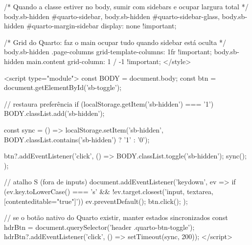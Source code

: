 \documentclass[
  portuguese,
  letterpaper,
  DIV=11,
  numbers=noendperiod]{scrreprt}
\begin{document}
  /* Quando a classe estiver no body, sumir com sidebars e ocupar largura total */
  body.sb-hidden #quarto-sidebar,
  body.sb-hidden #quarto-sidebar-glass,
  body.sb-hidden #quarto-margin-sidebar { display: none !important; }

  /* Grid do Quarto: faz o main ocupar tudo quando sidebar está oculta */
  body.sb-hidden .page-columns { grid-template-columns: 1fr !important; }
  body.sb-hidden main.content { grid-column: 1 / -1 !important; }
</style>

<script type="module">
  const BODY = document.body;
  const btn  = document.getElementById('sb-toggle');

  // restaura preferência
  if (localStorage.getItem('sb-hidden') === '1') BODY.classList.add('sb-hidden');

  const sync = () => localStorage.setItem('sb-hidden', BODY.classList.contains('sb-hidden') ? '1' : '0');

  btn?.addEventListener('click', () => { BODY.classList.toggle('sb-hidden'); sync(); });

  // atalho S (fora de inputs)
  document.addEventListener('keydown', ev => {
    if (ev.key.toLowerCase() === 's' && !ev.target.closest('input, textarea, [contenteditable="true"]')) {
      ev.preventDefault(); btn.click();
    }
  });

  // se o botão nativo do Quarto existir, manter estados sincronizados
  const hdrBtn = document.querySelector('header .quarto-btn-toggle');
  hdrBtn?.addEventListener('click', () => setTimeout(sync, 200));
</script>
\end{document}
